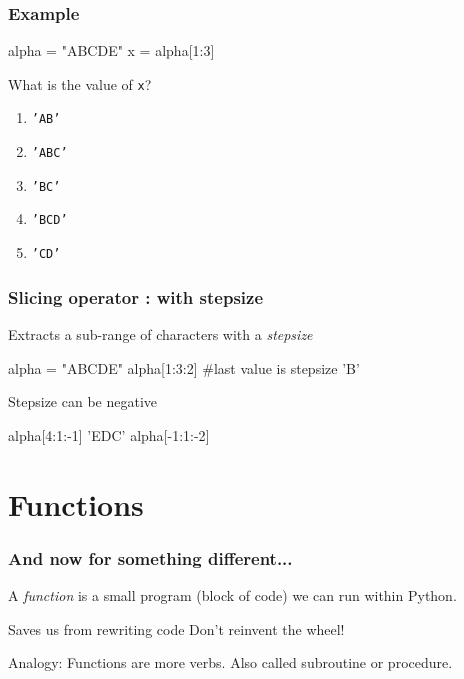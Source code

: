 \documentclass[11pt]{beamer}
\begin{document}
\begin{frame}[fragile]
  \frametitle{Example}
  \Enlarge

  \begin{semiverbatim}
alpha = "ABCDE"
x = alpha[1:3]
  \end{semiverbatim}
  What is the value of \texttt{x}?
  \begin{enumerate}[label=\Alph*]
  \item  \texttt{'AB'}
  \item  \texttt{'ABC'}
  \item  \texttt{'BC'}
  \item  \texttt{'BCD'}
  \item  \texttt{'CD'}
  \end{enumerate}
\end{frame}

\begin{frame}[fragile]
  \frametitle{Slicing operator \textbf{:} with stepsize}
  \Enlarge

  \begin{itemize}
  \myitem  Extracts a sub-range of characters with a \emph{stepsize}\pause
\begin{semiverbatim}
alpha = "ABCDE"  
alpha[1:3:\textcolor{CS101GradBot}{2}]   \hspace{2mm} \textcolor{CS101GradBot}{\small #last value is stepsize} \pause
'B'
\end{semiverbatim} \pause
\myitem Stepsize can be negative
\begin{semiverbatim}
alpha[4:1:\textcolor{CS101GradBot}{-1}] \pause
'EDC' \pause
alpha[-1:1:\textcolor{CS101GradBot}{-2}]
\end{semiverbatim}
  \end{itemize}
\end{frame}


\section{Functions}

\begin{frame}
  \frametitle{And now for something different...}
  \Enlarge

  \begin{itemize}
  \myitem  A \emph{function} is a small program (block of code) we can run within Python. \pause
    \begin{itemize}
    \mysubitem  Saves us from rewriting code
    \mysubitem  Don't reinvent the wheel!
    \end{itemize} \pause
  \myitem  Analogy:  Functions are more verbs. \pause
  \myitem  Also called subroutine or procedure.
  \end{itemize}
\end{frame}
\end{document}
